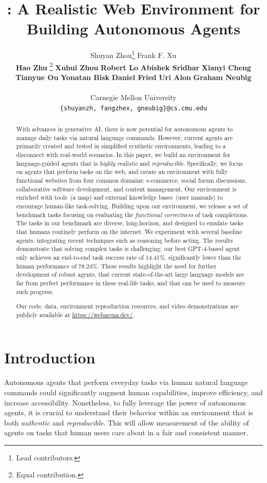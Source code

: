 \documentclass{article}
\title{\ours: A Realistic Web Environment for Building Autonomous Agents}
\author{%
  Shuyan Zhou\thanks{Lead contributors.} \quad
  Frank F. Xu\footnotemark[1] \\
  \textbf{Hao Zhu} \thanks{Equal contribution.} \quad 
  \textbf{Xuhui Zhou}\footnotemark[2] \quad
  \textbf{Robert Lo}\footnotemark[2] \quad 
  \textbf{Abishek Sridhar}\footnotemark[2] \quad 
  \textbf{Xianyi Cheng} \quad \\ 
  \textbf{Tianyue Ou} \quad
  \textbf{Yonatan Bisk} \quad 
  \textbf{Daniel Fried} \quad 
  \textbf{Uri Alon} \quad 
  \textbf{Graham Neubig} \\ \\
  {Carnegie Mellon University} \\
  \texttt{\{shuyanzh, fangzhex, gneubig\}@cs.cmu.edu} \\
}
\begin{document}
\maketitle


\begin{abstract}
With advances in generative AI, there is now potential for autonomous agents to manage daily tasks via natural language commands. However, current agents are primarily created and tested in simplified synthetic environments, leading to a disconnect with real-world scenarios.
In this paper, we build an environment for language-guided agents that is \emph{highly realistic} and \emph{reproducible}.
Specifically, we focus on agents that perform tasks on the web, and create an environment with fully functional websites from four common domains: e-commerce, social forum discussions, collaborative software development, and content management.
Our environment is enriched with tools~(\eg a map) and external knowledge bases~(\eg user manuals) to encourage human-like task-solving.
Building upon our environment, we release a set of benchmark tasks focusing on evaluating the \emph{functional correctness} of task completions.
The tasks in our benchmark are diverse, long-horizon, and designed to emulate tasks that humans routinely perform on the internet.
We experiment with several baseline agents, integrating recent techniques such as reasoning before acting. 
The results demonstrate that solving complex tasks is challenging: our best \textsc{GPT-4}-based agent only achieves an end-to-end task success rate of 14.41\%, significantly lower than the human performance of 78.24\%.
These results highlight the need for further development of robust agents, that current state-of-the-art large language models are far from perfect performance in these real-life tasks, and that \ours can be used to measure such progress.%

Our code, data, environment reproduction resources, and video demonstrations are publicly available at \url{https://webarena.dev/}.
\end{abstract}


\section{Introduction}\label{sec:intro}
Autonomous agents that  perform everyday tasks via human natural language commands could significantly augment human capabilities, improve efficiency, and increase accessibility.
Nonetheless, to fully leverage the power of autonomous agents, it is crucial to understand their behavior within an environment that is both \emph{authentic} and \emph{reproducible}.
This will allow measurement of the ability of agents on tasks that human users care about in a fair and consistent manner.
\end{document}
